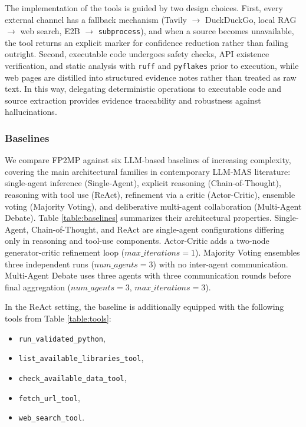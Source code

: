 The implementation of the tools is guided by two design choices.
First, every external channel has a fallback mechanism (Tavily $\to$ DuckDuckGo, local RAG $\to$ web search, E2B $\to$ \texttt{subprocess}), and when a source becomes unavailable, the tool returns an explicit marker for confidence reduction rather than failing outright.
Second, executable code undergoes safety checks, API existence verification, and static analysis with \texttt{ruff} and \texttt{pyflakes} prior to execution, while web pages are distilled into structured evidence notes rather than treated as raw text.
In this way, delegating deterministic operations to executable code and source extraction provides evidence traceability and robustness against hallucinations.

\subsubsection{Baselines}

We compare FP2MP against six LLM-based baselines of increasing complexity, covering the main architectural families in contemporary LLM-MAS literature: single-agent inference (Single-Agent), explicit reasoning (Chain-of-Thought), reasoning with tool use (ReAct), refinement via a critic (Actor-Critic), ensemble voting (Majority Voting), and deliberative multi-agent collaboration (Multi-Agent Debate).
Table \ref{table:baselines} summarizes their architectural properties.
Single-Agent, Chain-of-Thought, and ReAct are single-agent configurations differing only in reasoning and tool-use components. Actor-Critic adds a two-node generator-critic refinement loop ($max\_iterations = 1$).
Majority Voting ensembles three independent runs ($num\_agents = 3$) with no inter-agent communication.
Multi-Agent Debate uses three agents with three communication rounds before final aggregation ($num\_agents = 3$, $max\_iterations = 3$).

In the ReAct setting, the baseline is additionally equipped with the following tools from Table \ref{table:tools}:

\begin{itemize}
    \item \texttt{run\_validated\_python},
    \item \texttt{list\_available\_libraries\_tool},
    \item \texttt{check\_available\_data\_tool},
    \item \texttt{fetch\_url\_tool},
    \item \texttt{web\_search\_tool}.
\end{itemize}

